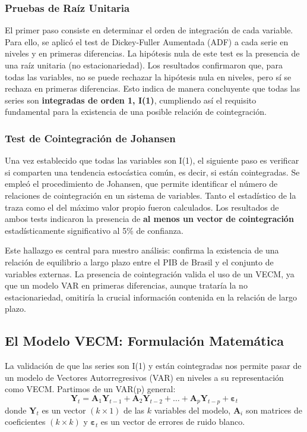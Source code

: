 \documentclass[12pt, a4paper]{article}
\begin{document}
\subsubsection{Pruebas de Raíz Unitaria}
El primer paso consiste en determinar el orden de integración de cada variable. Para ello, se aplicó el test de Dickey-Fuller Aumentada (ADF) a cada serie en niveles y en primeras diferencias. La hipótesis nula de este test es la presencia de una raíz unitaria (no estacionariedad). Los resultados confirmaron que, para todas las variables, no se puede rechazar la hipótesis nula en niveles, pero sí se rechaza en primeras diferencias. Esto indica de manera concluyente que todas las series son \textbf{integradas de orden 1, I(1)}, cumpliendo así el requisito fundamental para la existencia de una posible relación de cointegración.

\subsubsection{Test de Cointegración de Johansen}
Una vez establecido que todas las variables son I(1), el siguiente paso es verificar si comparten una tendencia estocástica común, es decir, si están cointegradas. Se empleó el procedimiento de Johansen, que permite identificar el número de relaciones de cointegración en un sistema de variables. Tanto el estadístico de la traza como el del máximo valor propio fueron calculados. Los resultados de ambos tests indicaron la presencia de \textbf{al menos un vector de cointegración} estadísticamente significativo al 5\% de confianza.

Este hallazgo es central para nuestro análisis: confirma la existencia de una relación de equilibrio a largo plazo entre el PIB de Brasil y el conjunto de variables externas. La presencia de cointegración valida el uso de un VECM, ya que un modelo VAR en primeras diferencias, aunque trataría la no estacionariedad, omitiría la crucial información contenida en la relación de largo plazo.

\subsection{El Modelo VECM: Formulación Matemática}
La validación de que las series son I(1) y están cointegradas nos permite pasar de un modelo de Vectores Autorregresivos (VAR) en niveles a su representación como VECM. Partimos de un VAR(p) general:
\begin{equation}
\mathbf{Y}_t = \mathbf{A}_1 \mathbf{Y}_{t-1} + \mathbf{A}_2 \mathbf{Y}_{t-2} + \dots + \mathbf{A}_p \mathbf{Y}_{t-p} + \boldsymbol{\varepsilon}_t
\end{equation}
donde $\mathbf{Y}_t$ es un vector $(k \times 1)$ de las $k$ variables del modelo, $\mathbf{A}_i$ son matrices de coeficientes $(k \times k)$ y $\boldsymbol{\varepsilon}_t$ es un vector de errores de ruido blanco.
\end{document}
